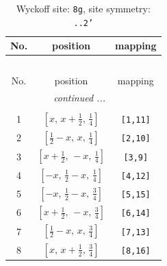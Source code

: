 \documentclass[fleqn,8pt]{jsarticle}
\begin{document}
\renewcommand{\arraystretch}{1.2}
\begin{longtable}{ccc}
\caption{Wyckoff site: {\tt 8g}, site symmetry: {\tt ..2'}}
 \\
 \hline \hline
No. & position & mapping \\ \hline \endfirsthead

\multicolumn{2}{l}{\tablename\ \thetable{}} \\
 \hline \hline
No. & position & mapping \\ \hline \endhead

 \hline \hline
\multicolumn{2}{r}{\footnotesize\it continued ...} \\ \endfoot

 \hline \hline
\multicolumn{2}{r}{} \\ \endlastfoot

1 & $\left[ x,\, x + \frac{1}{2},\, \frac{1}{4} \right]$ & {\tt [1,11]} \\ \hline
2 & $\left[ \frac{1}{2} - x,\, x,\, \frac{1}{4} \right]$ & {\tt [2,10]} \\ \hline
3 & $\left[ x + \frac{1}{2},\, - x,\, \frac{1}{4} \right]$ & {\tt [3,9]} \\ \hline
4 & $\left[ - x,\, \frac{1}{2} - x,\, \frac{1}{4} \right]$ & {\tt [4,12]} \\ \hline
5 & $\left[ - x,\, \frac{1}{2} - x,\, \frac{3}{4} \right]$ & {\tt [5,15]} \\ \hline
6 & $\left[ x + \frac{1}{2},\, - x,\, \frac{3}{4} \right]$ & {\tt [6,14]} \\ \hline
7 & $\left[ \frac{1}{2} - x,\, x,\, \frac{3}{4} \right]$ & {\tt [7,13]} \\ \hline
8 & $\left[ x,\, x + \frac{1}{2},\, \frac{3}{4} \right]$ & {\tt [8,16]} \\
\end{longtable}
\renewcommand{\arraystretch}{1.2}
\end{document}
